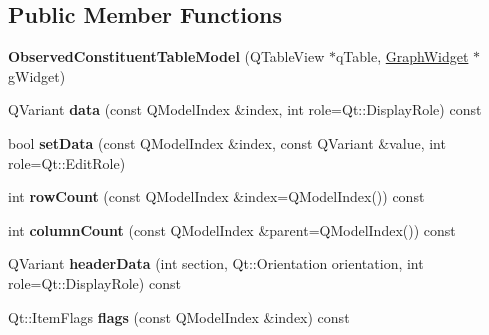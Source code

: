 \subsection*{Public Member Functions}
\begin{DoxyCompactItemize}
\item 
\mbox{\label{class_observed_constituent_table_model_a62259099824bd727738dc80eed322ec3}} 
{\bfseries Observed\+Constituent\+Table\+Model} (Q\+Table\+View $\ast$q\+Table, \hyperlink{class_graph_widget}{Graph\+Widget} $\ast$g\+Widget)
\item 
\mbox{\label{class_observed_constituent_table_model_aec5d51a719ad623c3b4acfb67a3f50a5}} 
Q\+Variant {\bfseries data} (const Q\+Model\+Index \&index, int role=Qt\+::\+Display\+Role) const
\item 
\mbox{\label{class_observed_constituent_table_model_a7fac3d0eae97a28d7f1c525722d710b2}} 
bool {\bfseries set\+Data} (const Q\+Model\+Index \&index, const Q\+Variant \&value, int role=Qt\+::\+Edit\+Role)
\item 
\mbox{\label{class_observed_constituent_table_model_a755fc53caa57d5949559be4f84633e75}} 
int {\bfseries row\+Count} (const Q\+Model\+Index \&index=Q\+Model\+Index()) const
\item 
\mbox{\label{class_observed_constituent_table_model_a0538a05c4d13fd24d7c0400b53b212b8}} 
int {\bfseries column\+Count} (const Q\+Model\+Index \&parent=Q\+Model\+Index()) const
\item 
\mbox{\label{class_observed_constituent_table_model_ad4c6ee2d3b652d877cc579777342bce6}} 
Q\+Variant {\bfseries header\+Data} (int section, Qt\+::\+Orientation orientation, int role=Qt\+::\+Display\+Role) const
\item 
\mbox{\label{class_observed_constituent_table_model_aeea0c641fc08f8ec31597cb249328524}} 
Qt\+::\+Item\+Flags {\bfseries flags} (const Q\+Model\+Index \&index) const
\item 
\mbox{\label{class_observed_constituent_table_model_a326cc8647c10d8d25cb87225914c8eb8}} 

\end{DoxyCompactItemize}

